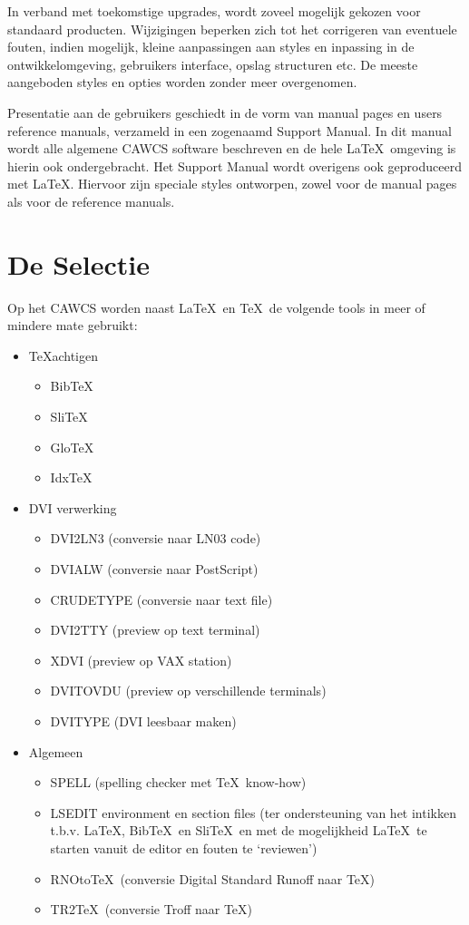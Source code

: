 In verband met toekomstige upgrades, wordt zoveel mogelijk gekozen voor
standaard producten. Wijzigingen beperken zich tot het corrigeren van eventuele
fouten, indien mogelijk, kleine aanpassingen aan styles en inpassing in de
ontwikkelomgeving, gebruikers interface, opslag structuren etc. De meeste
aangeboden styles en opties worden zonder meer overgenomen.

Presentatie aan de gebruikers geschiedt in de vorm van manual pages en users
reference manuals, verzameld in een zogenaamd Support Manual. In dit manual
wordt alle algemene CAWCS software beschreven en de hele \LaTeX\ omgeving is
hierin ook ondergebracht. Het Support Manual wordt overigens ook
geproduceerd met \LaTeX. Hiervoor zijn speciale styles ontworpen, zowel voor de
manual pages als voor de reference manuals.

\section{De Selectie}

Op het CAWCS worden naast \LaTeX\ en \TeX\ de volgende tools in meer of mindere
mate gebruikt:

\nobreak
\begin{itemize}
\item \TeX\-achtigen
    \nobreak
    \begin{itemize}
    \item Bib\TeX\ 
    \item Sli\TeX\ 
    \item Glo\TeX\ 
    \item Idx\TeX\ 
    \end{itemize}
\goodbreak     
\item DVI verwerking
\nobreak
    \begin{itemize}
    \item DVI2LN3   (conversie naar LN03 code) 
    \item DVIALW    (conversie naar PostScript)
    \item CRUDETYPE (conversie naar text file) 
    \item DVI2TTY   (preview op text terminal) 
    \item XDVI      (preview op VAX station)   
    \item DVITOVDU  (preview op verschillende terminals)     
    \item DVITYPE   (DVI leesbaar maken)       
    \end{itemize}
\goodbreak
\item Algemeen
\nobreak
    \begin{itemize}
    \item SPELL (spelling checker met \TeX\ know-how)
    \item LSEDIT environment en section files (ter ondersteuning van het
    intikken t.b.v. \LaTeX, Bib\TeX\ en Sli\TeX\ en met de mogelijkheid \LaTeX\
    te starten vanuit de editor en fouten te `reviewen')
    \item RNOto\TeX\ (conversie Digital Standard Runoff naar \TeX)
    \item TR2\TeX\ (conversie Troff naar \TeX)
    \end{itemize}
\end{itemize}


